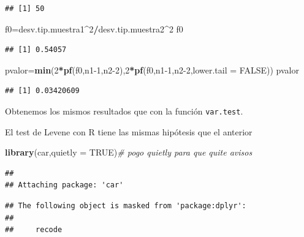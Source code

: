 \documentclass[
]{article}
\newenvironment{Shaded}{\begin{snugshade}}{\end{snugshade}}
\newcommand{\CommentTok}[1]{\textcolor[rgb]{0.56,0.35,0.01}{\textit{#1}}}
\newcommand{\DataTypeTok}[1]{\textcolor[rgb]{0.13,0.29,0.53}{#1}}
\newcommand{\DecValTok}[1]{\textcolor[rgb]{0.00,0.00,0.81}{#1}}
\newcommand{\KeywordTok}[1]{\textcolor[rgb]{0.13,0.29,0.53}{\textbf{#1}}}
\newcommand{\NormalTok}[1]{#1}
\newcommand{\OperatorTok}[1]{\textcolor[rgb]{0.81,0.36,0.00}{\textbf{#1}}}
\newcommand{\OtherTok}[1]{\textcolor[rgb]{0.56,0.35,0.01}{#1}}
\begin{document}
\begin{verbatim}
## [1] 50
\end{verbatim}

\begin{Shaded}
\begin{Highlighting}[]
\NormalTok{f0=desv.tip.muestra1}\OperatorTok{\^{}}\DecValTok{2}\OperatorTok{/}\NormalTok{desv.tip.muestra2}\OperatorTok{\^{}}\DecValTok{2}
\NormalTok{f0}
\end{Highlighting}
\end{Shaded}

\begin{verbatim}
## [1] 0.54057
\end{verbatim}

\begin{Shaded}
\begin{Highlighting}[]
\NormalTok{pvalor=}\KeywordTok{min}\NormalTok{(}\DecValTok{2}\OperatorTok{*}\KeywordTok{pf}\NormalTok{(f0,n1}\DecValTok{{-}1}\NormalTok{,n2}\DecValTok{{-}2}\NormalTok{),}\DecValTok{2}\OperatorTok{*}\KeywordTok{pf}\NormalTok{(f0,n1}\DecValTok{{-}1}\NormalTok{,n2}\DecValTok{{-}2}\NormalTok{,}\DataTypeTok{lower.tail =} \OtherTok{FALSE}\NormalTok{))}
\NormalTok{pvalor}
\end{Highlighting}
\end{Shaded}

\begin{verbatim}
## [1] 0.03420609
\end{verbatim}

Obtenemos los mismos resultados que con la función \texttt{var.test}.

El test de Levene con R tiene las mismas hipótesis que el anterior

\begin{Shaded}
\begin{Highlighting}[]
\KeywordTok{library}\NormalTok{(car,}\DataTypeTok{quietly =} \OtherTok{TRUE}\NormalTok{)}\CommentTok{\# pogo quietly para que quite avisos}
\end{Highlighting}
\end{Shaded}

\begin{verbatim}
## 
## Attaching package: 'car'
\end{verbatim}

\begin{verbatim}
## The following object is masked from 'package:dplyr':
## 
##     recode
\end{verbatim}
\end{document}
